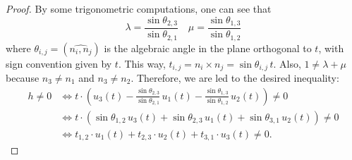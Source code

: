 \documentclass[11pt]{article}
\theoremstyle{plain}
\theoremstyle{definition}
\theoremstyle{remark}
\begin{document}
\begin{proof}
	By some trigonometric computations, one can see that
	\[\lambda = \frac{\sin \theta_{2,3}}{\sin \theta_{2,1}} \quad \mu = \frac{\sin \theta_{1,3}}{\sin \theta_{1,2}}\]
	where $\theta_{i,j} = (\widehat{n_i,n_j})$ is the algebraic angle in the plane orthogonal to $t$, with sign convention given by $t$. This way, $t_{i,j} = n_i \times n_j = \sin \theta_{i,j} \, t$. Also, $1 \neq \lambda + \mu$ because $n_3 \neq n_1$ and $n_3 \neq n_2$. 
	Therefore, we are led to the desired inequality:
	\begin{align*}
		h \neq 0 & \Leftrightarrow t \cdot \left(u_3(t) - \frac{\sin \theta_{2,3}}{\sin \theta_{2,1}}  \, u_1(t) - \frac{\sin \theta_{1,3}}{\sin \theta_{1,2}} \, u_2(t) \right) \neq 0 \\
		& \Leftrightarrow t \cdot \left( \sin \theta_{1,2} \, u_3(t) + \sin \theta_{2,3} \, u_1(t) + \sin \theta_{3,1} \, u_2(t) \right) \neq 0 \\
		& \Leftrightarrow t_{1,2} \cdot u_1(t) + t_{2,3} \cdot u_2(t) + t_{3,1} \cdot u_3(t) \neq 0.
	\end{align*}
	
\end{proof}
\end{document}
